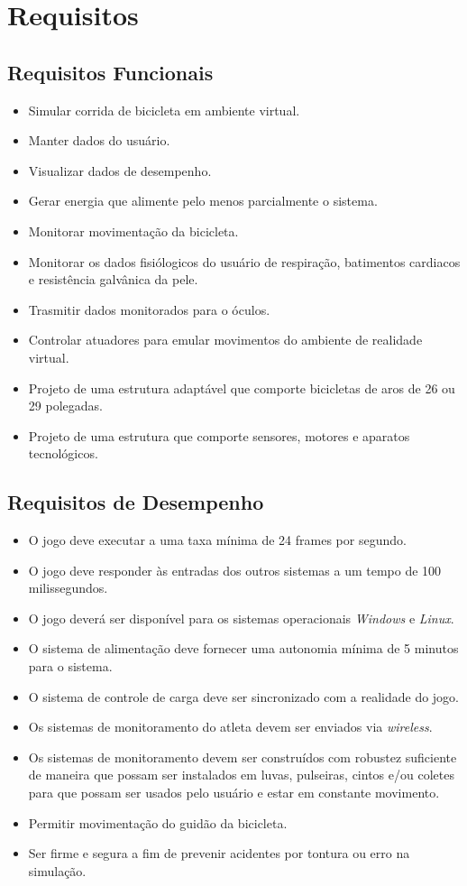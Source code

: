 \section{Requisitos}
\label{sec:requisitos}
\subsection{Requisitos Funcionais}

\begin{itemize}
\item Simular corrida de bicicleta em ambiente virtual.
\item Manter dados do usuário.
\item Visualizar dados de desempenho.
\item Gerar energia que alimente pelo menos parcialmente o sistema.
\item Monitorar movimentação da bicicleta.
\item Monitorar os dados fisiólogicos do usuário de respiração, batimentos cardiacos e resistência galvânica da pele.
\item Trasmitir dados monitorados para o óculos.
\item Controlar atuadores para emular movimentos do ambiente de realidade virtual.
\item Projeto de uma estrutura adaptável que comporte bicicletas de aros de 26 ou 29 polegadas.
\item Projeto de uma estrutura que comporte sensores, motores e aparatos tecnológicos.

\end{itemize}

\subsection{Requisitos de Desempenho}

\begin{itemize}
\item O jogo deve executar a uma taxa mínima de 24 frames por segundo.
\item O jogo deve responder às entradas dos outros sistemas a um tempo de 100 milissegundos.
\item O jogo deverá ser disponível para os sistemas operacionais \textit{Windows} e \textit{Linux}.
\item O sistema de alimentação deve fornecer uma autonomia mínima de 5 minutos para o sistema.
\item O sistema de controle de carga deve ser sincronizado com a realidade do jogo. 
\item Os sistemas de monitoramento do atleta devem ser enviados via \textit{wireless}.
\item Os sistemas de monitoramento devem ser construídos com robustez suficiente de maneira que possam ser instalados em luvas, pulseiras, cintos e/ou coletes para que possam ser usados pelo usuário e estar em constante movimento.
\item Permitir movimentação do guidão da bicicleta.
\item Ser firme e segura a fim de prevenir acidentes por tontura ou erro na simulação.
\end{itemize}

